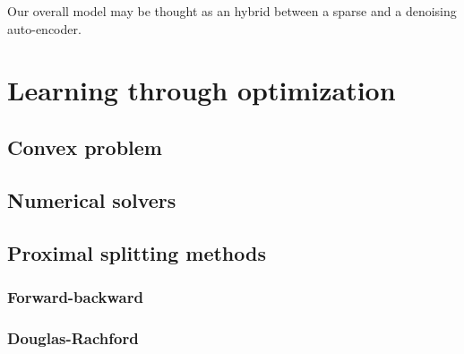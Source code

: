 
Our overall model may be thought as an hybrid between a sparse and a denoising auto-encoder.




\chapter{Learning through optimization} \label{chap:learning}

\section{Convex problem}

\section{Numerical solvers}

\section{Proximal splitting methods}

\subsection{Forward-backward}

\subsection{Douglas-Rachford}

